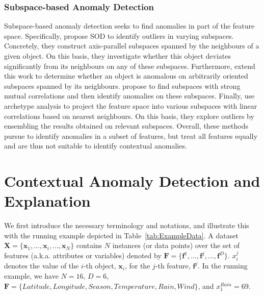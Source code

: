 \documentclass[pdflatex,sn-basic]{sn-jnl}%
\theoremstyle{thmstyleone}%
\theoremstyle{thmstyletwo}%
\theoremstyle{thmstylethree}%
\begin{document}
\subsubsection{Subspace-based Anomaly Detection}
Subspace-based anomaly detection seeks to find anomalies in part of the feature space. Specifically, \cite{kriegel2009outlier} propose SOD to identify outliers in varying subspaces. Concretely, they construct axis-parallel subspaces spanned by the neighbours of a given object. On this basis, they investigate whether this object deviates significantly from its neighbours on any of these subspaces. Furthermore, \cite{kriegel2012outlier} extend this work to determine whether an object is anomalous on arbitrarily oriented subspaces spanned by its neighbours. \cite{nguyen2013cmi} propose to find subspaces with strong mutual correlations and then identify anomalies on these subspaces. Finally, \cite{cabero2021archetype} use archetype analysis to project the feature space into various subspaces with linear correlations based on nearest neighbours. On this basis, they explore outliers by ensembling the results obtained on relevant subspaces. Overall, these methods pursue to identify anomalies in a subset of features, but treat all features equally and are thus not suitable to identify contextual anomalies.

\section{Contextual Anomaly Detection and Explanation}
\label{sec:framework}

We first introduce the necessary terminology and notations, and illustrate this with the running example depicted in Table~\ref{tab:ExampleData}. A dataset $\mathbf{X} =\{\mathbf{x}_{1},\ldots,\mathbf{x}_{i},\ldots,\mathbf{x}_{N}\}$ contains $N$ instances (or data points) over the set of features (a.k.a. attributes or variables) denoted by $\mathbf{F} = \{\mathbf{f}^{1},\ldots,\mathbf{f}^{j},\ldots,\mathbf{f}^{D}\}$. $x_{i}^{j}$ denotes the value of the $i$-th object, $\mathbf{x}_{i}$, for the $j$-th feature, $\mathbf{f}^{j}$. In the running example,  we have $N=16$, $D=6$, $\mathbf{F}= \{Latitude, Longitude, Season, Temperature, Rain, Wind\}$, and $x_{1}^{Rain} = 69$.
\end{document}
